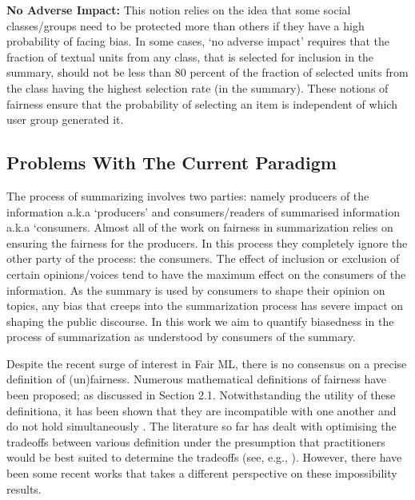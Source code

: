 {\textbf{No Adverse Impact:} This notion relies on the idea that some social classes/groups need to be protected more than others if they have a high probability of facing bias. In some cases, ‘no adverse impact’ requires that the fraction of textual units from any class, that is selected for inclusion in the summary, should not be less than 80 percent of the fraction of selected units from the class having the highest selection rate (in the summary). These notions of fairness ensure that the probability of selecting an item is independent of which user group generated it.
}
\subsection{Problems With The Current Paradigm}
{The process of summarizing involves two parties: namely producers of the information a.k.a ‘producers’ and consumers/readers of summarised information a.k.a ‘consumers. Almost all of the work on fairness in summarization relies on ensuring the fairness for the producers. In this process they completely ignore the other party of the process: the consumers. The effect of inclusion or exclusion of certain opinions/voices tend to have the maximum effect on the consumers of the information. As the summary is used by consumers to shape their opinion on topics, any bias that creeps into the summarization process has severe impact on shaping the public discourse. In this work we aim to quantify biasedness in the process of summarization as understood by consumers of the summary.

Despite the recent surge of interest in Fair ML, there is no consensus on a precise definition of (un)fairness. Numerous mathematical
definitions of fairness have been proposed; as discussed in Section 2.1. Notwithstanding the utility of these definitiona, it has been shown that they are incompatible with one another and do not hold simultaneously \cite{chouldechova2017fair}. The literature so far
has dealt with optimising the tradeoffs between various definition under the presumption that practitioners would be best suited to determine the tradeoffs (see, e.g., \cite{corbett2017algorithmic}).
However, there have been some recent works that takes a different perspective on these impossibility results. 


}
